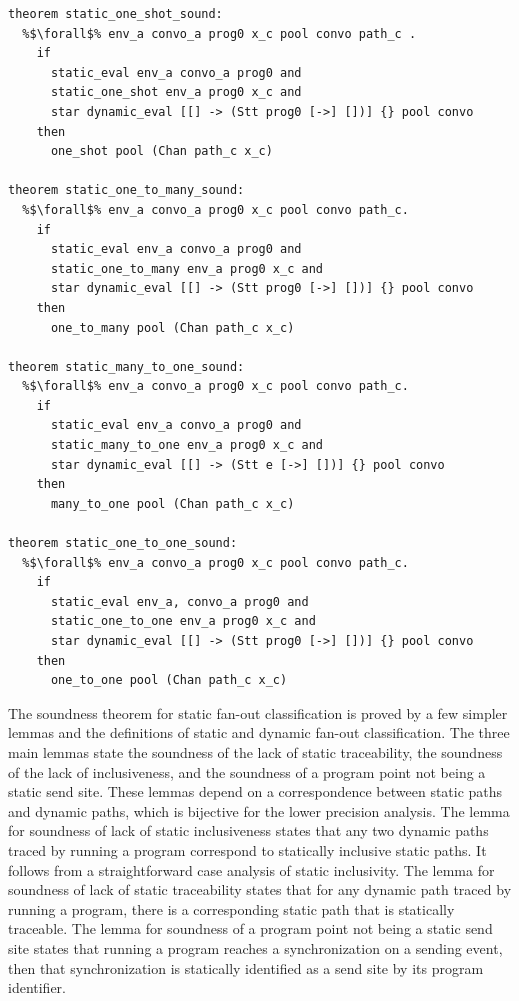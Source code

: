 \documentclass{article}
\begin{document}
\begin{lstlisting}[language=logic, escapechar=\%]
theorem static_one_shot_sound: 
  %$\forall$% env_a convo_a prog0 x_c pool convo path_c .
    if
      static_eval env_a convo_a prog0 and 
      static_one_shot env_a prog0 x_c and 
      star dynamic_eval [[] -> (Stt prog0 [->] [])] {} pool convo
    then
      one_shot pool (Chan path_c x_c)

theorem static_one_to_many_sound:
  %$\forall$% env_a convo_a prog0 x_c pool convo path_c. 
    if 
      static_eval env_a convo_a prog0 and 
      static_one_to_many env_a prog0 x_c and 
      star dynamic_eval [[] -> (Stt prog0 [->] [])] {} pool convo
    then
      one_to_many pool (Chan path_c x_c)

theorem static_many_to_one_sound:
  %$\forall$% env_a convo_a prog0 x_c pool convo path_c. 
    if
      static_eval env_a convo_a prog0 and 
      static_many_to_one env_a prog0 x_c and 
      star dynamic_eval [[] -> (Stt e [->] [])] {} pool convo
    then
      many_to_one pool (Chan path_c x_c)

theorem static_one_to_one_sound:
  %$\forall$% env_a convo_a prog0 x_c pool convo path_c. 
    if
      static_eval env_a, convo_a prog0 and 
      static_one_to_one env_a prog0 x_c and
      star dynamic_eval [[] -> (Stt prog0 [->] [])] {} pool convo
    then
      one_to_one pool (Chan path_c x_c)

\end{lstlisting}

The soundness theorem for static fan-out classification is proved
by a few simpler lemmas and the
definitions of static and dynamic fan-out classification.  The three main lemmas state the
soundness of the lack of static traceability, the soundness of the lack of inclusiveness, and
the soundness of a program point not being a static send site. These lemmas depend on a
correspondence between static paths and dynamic paths, which is bijective for the lower
precision analysis. The lemma for soundness of lack of static inclusiveness states that any two
dynamic paths traced by running a program correspond to statically inclusive static paths. It
follows from a straightforward case analysis of static inclusivity. The lemma for soundness of
lack of static traceability states that for any dynamic path traced by running a program, there
is a corresponding static path that is statically traceable. The lemma for soundness of a
program point not being a static send site states that running a program reaches a
synchronization on a sending event, then that synchronization is statically identified as a
send site by its program identifier.
\end{document}
